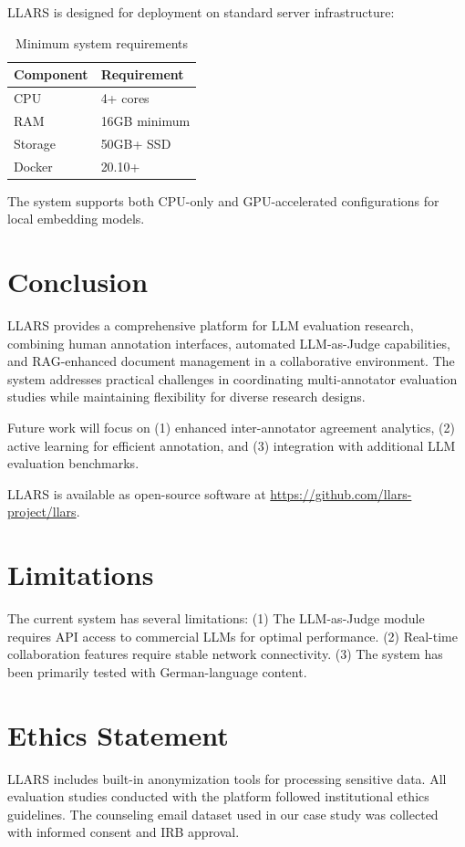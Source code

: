 \documentclass[11pt]{article}
\begin{document}
LLARS is designed for deployment on standard server infrastructure:

\begin{table}[h]
\centering
\begin{tabular}{ll}
\toprule
\textbf{Component} & \textbf{Requirement} \\
\midrule
CPU & 4+ cores \\
RAM & 16GB minimum \\
Storage & 50GB+ SSD \\
Docker & 20.10+ \\
\bottomrule
\end{tabular}
\caption{Minimum system requirements}
\end{table}

The system supports both CPU-only and GPU-accelerated configurations for local embedding models.

\section{Conclusion}

LLARS provides a comprehensive platform for LLM evaluation research, combining human annotation interfaces, automated LLM-as-Judge capabilities, and RAG-enhanced document management in a collaborative environment.
The system addresses practical challenges in coordinating multi-annotator evaluation studies while maintaining flexibility for diverse research designs.

Future work will focus on (1) enhanced inter-annotator agreement analytics, (2) active learning for efficient annotation, and (3) integration with additional LLM evaluation benchmarks.

LLARS is available as open-source software at \url{https://github.com/llars-project/llars}.

\section*{Limitations}

The current system has several limitations:
(1) The LLM-as-Judge module requires API access to commercial LLMs for optimal performance.
(2) Real-time collaboration features require stable network connectivity.
(3) The system has been primarily tested with German-language content.

\section*{Ethics Statement}

LLARS includes built-in anonymization tools for processing sensitive data.
All evaluation studies conducted with the platform followed institutional ethics guidelines.
The counseling email dataset used in our case study was collected with informed consent and IRB approval.



\end{document}

